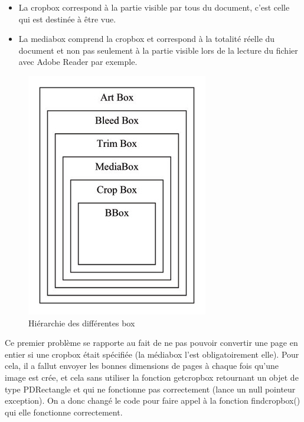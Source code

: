    \begin{itemize}
    \item La cropbox correspond  à la partie visible par tous du document, 
     c'est celle qui est destinée à être vue.
    \item La mediabox comprend la cropbox et correspond à la totalité 
     réelle du document et non pas seulement à la partie visible 
     lors de la lecture du fichier avec Adobe Reader par exemple. 
    \end{itemize}
    \newpage

     \begin{figure}[h]
            \begin{center}
            \includegraphics[scale=0.6]{crop_media_box.jpg} 
            \end{center}
            \caption{Hiérarchie des différentes box}
            \label{Hiérarchie des différentes box}
     \end{figure} 

	        Ce premier problème se rapporte au fait de ne pas pouvoir convertir
        une page en entier si une cropbox était spécifiée (la médiabox l'est 
        obligatoirement elle). Pour cela, il a fallut envoyer les bonnes dimensions 
        de pages à chaque fois qu'une image est crée, et cela sans utiliser la fonction
        getcropbox retournant un objet de type PDRectangle et qui ne fonctionne 
        pas correctement (lance un null pointeur exception). On a donc changé le
        code pour faire appel à la fonction findcropbox() qui elle fonctionne 
        correctement.

